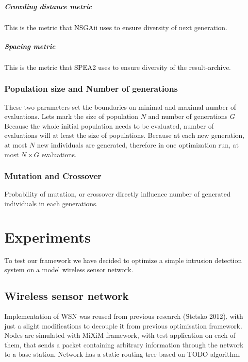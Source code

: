 \documentclass[12pt,oneside,draft]{fithesis2}
\begin{document}
\paragraph{Crowding distance metric}
This is the metric that NSGAii uses to ensure diversity of next generation.

\paragraph{Spacing metric}
This is the metric that SPEA2 uses to ensure diversity of the result-archive. 

\subsection{Population size and Number of generations}
These two parameters set the boundaries on minimal and maximal number of evaluations. Lets mark the size of population $N$ and number of generations $G$ Because the whole initial population needs to be evaluated, number of evaluations will at least the size of populations.
Because at each new generation, at most $N$ new individuals are generated, therefore in one optimization run, at most $N \times G$ evaluations.

\subsection{Mutation and Crossover}
Probability of mutation, or crossover directly influence number of generated individuals in each generations.


\chapter{Experiments}
To test our framework we have decided to optimize a simple intrusion detection system on a model wireless sensor network.

\section{Wireless sensor network}
Implementation of WSN was reused from previous research (Stetsko 2012), with just a slight modifications to decouple it from previous optimisation framework. Nodes are simulated with MiXiM framework, with test application on each of them, that sends a packet containing arbitrary information through the network to a base station. Network has a static routing tree based on TODO algorithm. 
\end{document}
